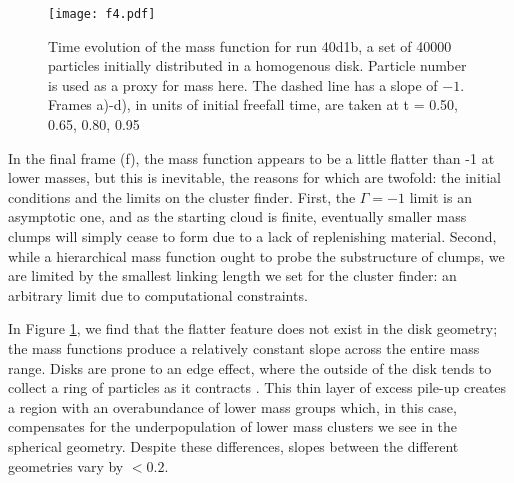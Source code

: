 \documentclass[iop]{emulateapj}
\begin{document}
\begin{figure}[h!]
    \centering
    \texttt{[image: f4.pdf]}
    \caption{Time evolution of the mass function for run 40d1b, a set of 40000 particles initially distributed in a homogenous disk. Particle number is used as a proxy for mass here. The dashed line has a slope of $-1$.  Frames a)-d), in units of initial freefall time, are taken at t = 0.50, 0.65, 0.80, 0.95}
    \label{fig:teval40kdisk1}
\end{figure}


In the final frame (f), the mass function appears
to be a little flatter than -1 at lower masses, but this is inevitable, the reasons for which are twofold: the initial conditions and the limits on the cluster finder. First, the $\Gamma = -1$ limit is an asymptotic one, and as the starting cloud is finite, eventually smaller mass clumps will simply cease to form due to a lack of replenishing material. Second, while a hierarchical mass function ought to probe the substructure of clumps, we are limited by the smallest linking length we set for the cluster finder: an arbitrary limit due to computational constraints. 
\par In Figure \ref{fig:teval40kdisk1}, we find that the flatter feature does not exist in the disk geometry; the mass functions produce a relatively constant slope across the entire mass range. Disks are prone to an edge effect, where the outside of the disk tends to collect a ring of particles as it contracts \citep{bh04}. This thin layer of excess pile-up creates a region with an overabundance of lower mass groups which, in this case, compensates for the underpopulation of lower mass clusters we see in the spherical geometry. Despite these differences, slopes between the different geometries vary by $<0.2$. 
\end{document}

